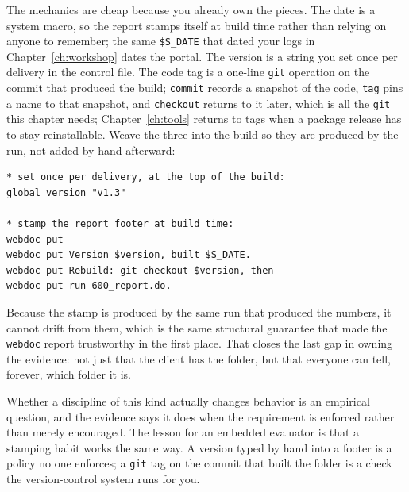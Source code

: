 The mechanics are cheap because you already own the pieces. The date is a system macro, so the report stamps itself at build time rather than relying on anyone to remember; the same \texttt{\$S\_DATE} that dated your logs in Chapter~\ref{ch:workshop} dates the portal. The version is a string you set once per delivery in the control file. The code tag is a one-line \texttt{git} operation on the commit that produced the build; \texttt{commit} records a snapshot of the code, \texttt{tag} pins a name to that snapshot, and \texttt{checkout} returns to it later, which is all the \texttt{git} this chapter needs; Chapter~\ref{ch:tools} returns to tags when a package release has to stay reinstallable. Weave the three into the build so they are produced by the run, not added by hand afterward:
\par
{\footnotesize
\begin{verbatim}
* set once per delivery, at the top of the build:
global version "v1.3"

* stamp the report footer at build time:
webdoc put ---
webdoc put Version $version, built $S_DATE.
webdoc put Rebuild: git checkout $version, then
webdoc put run 600_report.do.
\end{verbatim}
}
Because the stamp is produced by the same run that produced the numbers, it cannot drift from them, which is the same structural guarantee that made the \texttt{webdoc} report trustworthy in the first place. That closes the last gap in owning the evidence: not just that the client has the folder, but that everyone can tell, forever, which folder it is.

Whether a discipline of this kind actually changes behavior is an empirical question, and the evidence says it does when the requirement is enforced rather than merely encouraged. The lesson for an embedded evaluator is that a stamping habit works the same way. A version typed by hand into a footer is a policy no one enforces; a \texttt{git} tag on the commit that built the folder is a check the version-control system runs for you.

